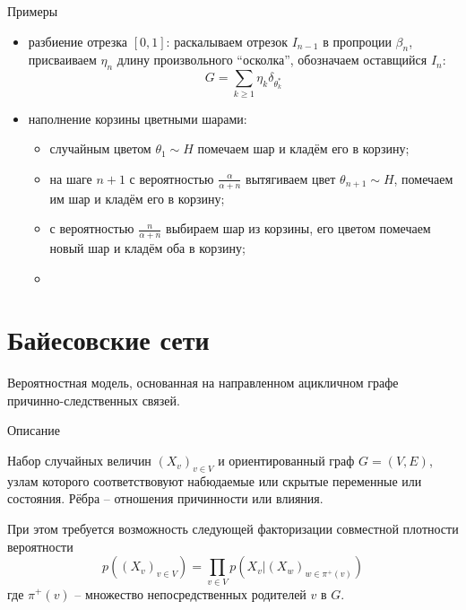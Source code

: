 \documentclass{beamer}
\newcommand{\clo}[1]{\left [ #1 \right ]}
\newcommand{\brac}[1]{\left ( #1 \right )}
\newcommand{\induc}[1]{\left . #1 \right \vert}
\begin{document}
\begin{frame}
  \begin{block}{Примеры}

    \begin{itemize}
      \item разбиение отрезка $\clo{0,1}$: раскалываем отрезок $I_{n-1}$ в пропроции $\beta_n$, присваиваем $\eta_n$ длину произвольного ``осколка'', обозначаем оставщийся $I_n$: \[G = \sum_{k\geq1} \eta_k \delta_{\theta_k^*}\]
      \item наполнение корзины цветными шарами: \begin{itemize}
        \item случайным цветом $\theta_1\sim H$ помечаем шар и кладём его в корзину;
        \item на шаге $n+1$ с вероятностью $\frac{\alpha}{\alpha+n}$ вытягиваем цвет $\theta_{n+1}\sim H$, помечаем им шар и кладём его в корзину;
        \item с вероятностью $\frac{n}{\alpha+n}$ выбираем шар из корзины, его цветом помечаем новый шар и кладём оба в корзину;
        \item 
      \end{itemize} 
    \end{itemize}
  \end{block}
\end{frame}


\section{Байесовские сети} %
\label{sec:bayesian_networks}

\begin{frame}
  \begin{block}
  
    Вероятностная модель, основанная на направленном ацикличном графе причинно-следственных связей.
  \end{block}
  \begin{block}{Описание}

    Набор случайных величин $\brac{X_v}_{v\in V}$ и ориентированный граф $G=(V,E)$, узлам которого соответствовуют набюдаемые или скрытые переменные или состояния. Рёбра -- отношения причинности или влияния.

    При этом требуется возможность следующей факторизации совместной плотности вероятности
    \[p\brac{\brac{X_v}_{v\in V}} = \prod_{v\in V} p\brac{\induc{X_v} \brac{X_w}_{w\in\pi^+(v)}}\]
    где $\pi^+(v)$ -- множество непосредственных родителей $v$ в $G$.
  \end{block}
\end{frame}
\end{document}
